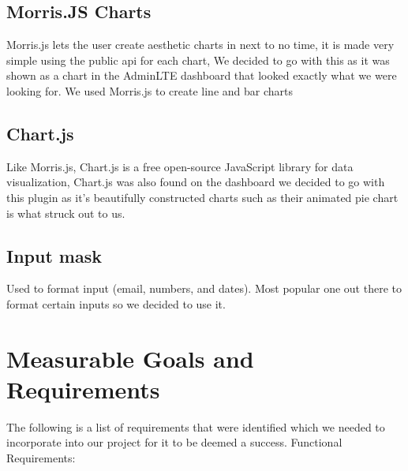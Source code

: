 \subsection{Morris.JS Charts}
Morris.js lets the user create aesthetic charts in next to no time, it is made very simple using the public api for each chart, We decided to go with this as it was shown as a chart in the AdminLTE dashboard that looked exactly what we were looking for. We used Morris.js to create line and bar charts

\subsection{Chart.js}
Like Morris.js, Chart.js is a free open-source JavaScript library for data visualization, Chart.js was also found on the dashboard we decided to go with this plugin as it's beautifully constructed charts such as their animated pie chart is what struck out to us. 
\subsection{Input mask}

Used to format input (email, numbers, and dates). Most popular one out there to format certain inputs so we decided to use it.

\section{Measurable Goals and Requirements}

The following is a list of requirements that were identified which we needed to incorporate into our project for it to be deemed a success.
Functional Requirements:


